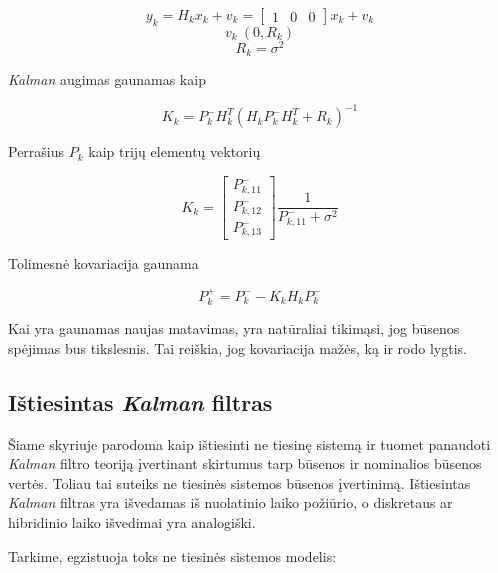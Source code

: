     \begin{equation}
        y_k = H_kx_k + v_k = \begin{bmatrix} 1 & 0 & 0 \end{bmatrix} x_k + v_k
    \end{equation}
    \begin{equation}
        v_k ~ (0, R_k)
    \end{equation}
    \begin{equation}
        R_k = \sigma^2
    \end{equation}

    \textit{Kalman} augimas gaunamas kaip

    \begin{equation}
        K_k = P_k^-H_k^T(H_kP_k^-H_k^T+R_k)^{-1}
    \end{equation}

    Perrašius $P_k$ kaip trijų elementų vektorių

    \begin{equation}
        K_k = \begin{bmatrix} P_{k,11}^- \\ P_{k,12}^- \\ P_{k,13}^- \end{bmatrix} \frac{1}{P_{k,11}^- + \sigma^2}
    \end{equation}

    Tolimesnė kovariacija gaunama

    \begin{equation}
        P_k^+ = P_k^- - K_kH_kP_k^-
    \end{equation}

    Kai yra gaunamas naujas matavimas, yra natūraliai tikimąsi, jog būsenos spėjimas bus tikslesnis.
    Tai reiškia, jog kovariacija mažės, ką ir rodo lygtis.

    \subsection{Ištiesintas \textit{Kalman} filtras}

    Šiame skyriuje parodoma kaip ištiesinti ne tiesinę sistemą ir tuomet panaudoti \textit{Kalman} filtro teoriją įvertinant skirtumus tarp būsenos ir nominalios būsenos vertės.
    Toliau tai suteiks ne tiesinės sistemos būsenos įvertinimą.
    Ištiesintas \textit{Kalman} filtras yra išvedamas iš nuolatinio laiko požiūrio, o diskretaus ar hibridinio laiko išvedimai yra analogiški.

    Tarkime, egzistuoja toks ne tiesinės sistemos modelis:

